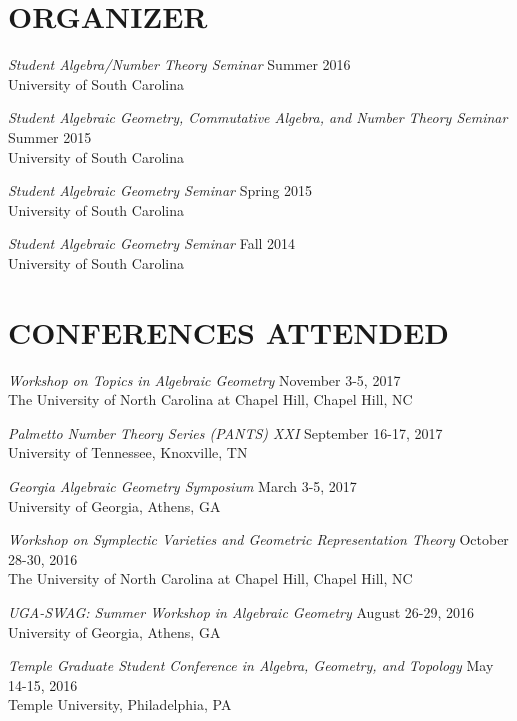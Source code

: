 \documentclass[line,overlapped]{res}
\begin{document}
\begin{resume}
         \section{ORGANIZER}
         \textsl{Student Algebra/Number Theory Seminar} \hfill Summer 2016\\
	 University of South Carolina
         
	 \textsl{Student Algebraic Geometry, Commutative Algebra, and Number Theory Seminar} \hfill Summer 2015\\
	 University of South Carolina
	 
         \textsl{Student Algebraic Geometry Seminar} \hfill Spring 2015\\
	 University of South Carolina

         \textsl{Student Algebraic Geometry Seminar} \hfill Fall 2014\\
	 University of South Carolina
 \newpage

 \section{CONFERENCES ATTENDED}
         \textsl{Workshop on Topics in Algebraic Geometry} \hfill November 3-5, 2017\\
          The University of North Carolina at Chapel Hill, Chapel Hill, NC
         
         \textsl{Palmetto Number Theory Series (PANTS) XXI} \hfill September 16-17, 2017\\
         University of Tennessee, Knoxville, TN
 
 \textsl{Georgia Algebraic Geometry Symposium} \hfill March 3-5, 2017\\
 University of Georgia, Athens, GA

 \textsl{Workshop on Symplectic Varieties and Geometric Representation Theory} \hfill October 28-30, 2016\\
 The University of North Carolina at Chapel Hill, Chapel Hill, NC
 
 \textsl{UGA-SWAG: Summer Workshop in Algebraic Geometry} \hfill August 26-29, 2016\\
 University of Georgia, Athens, GA

         \textsl{Temple Graduate Student Conference in Algebra, Geometry, and Topology} \hfill May 14-15, 2016\\
         Temple University, Philadelphia, PA
         

\end{resume}
\end{document}

